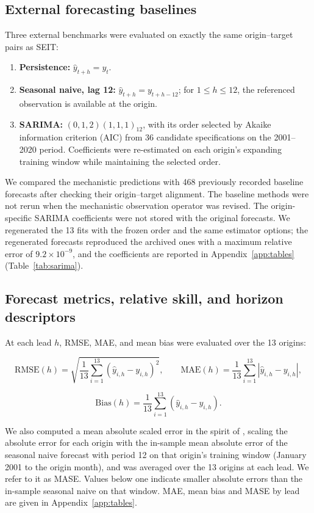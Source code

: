 \documentclass[pdflatex,sn-mathphys-ay]{sn-jnl}
\begin{document}
\subsection{External forecasting baselines}

Three external benchmarks were evaluated on exactly the same origin--target pairs as SEIT:

\begin{enumerate}
\item \textbf{Persistence:} $\widehat y_{t+h}=y_t$.
\item \textbf{Seasonal naive, lag 12:} $\widehat y_{t+h}=y_{t+h-12}$; for $1\le h\le12$, the referenced observation is available at the origin.
\item \textbf{SARIMA:} $(0,1,2)(1,1,1)_{12}$, with its order selected by Akaike information criterion (AIC) from 36 candidate specifications on the 2001--2020 period. Coefficients were re-estimated on each origin's expanding training window while maintaining the selected order.
\end{enumerate}

We compared the mechanistic predictions with 468 previously recorded baseline forecasts after checking their origin--target alignment. The baseline methods were not rerun when the mechanistic observation operator was revised. The origin-specific SARIMA coefficients were not stored with the original forecasts. We regenerated the 13 fits with the frozen order and the same estimator options; the regenerated forecasts reproduced the archived ones with a maximum relative error of $9.2\times10^{-9}$, and the coefficients are reported in Appendix~\ref{app:tables} (Table~\ref{tab:sarima}).

\subsection{Forecast metrics, relative skill, and horizon descriptors}

At each lead $h$, RMSE, MAE, and mean bias were evaluated over the 13 origins:

\[
\mathrm{RMSE}(h)=\sqrt{\frac1{13}\sum_{i=1}^{13}(\widehat y_{i,h}-y_{i,h})^2},\qquad
\mathrm{MAE}(h)=\frac1{13}\sum_{i=1}^{13}|\widehat y_{i,h}-y_{i,h}|,
\]

\[
\mathrm{Bias}(h)=\frac1{13}\sum_{i=1}^{13}(\widehat y_{i,h}-y_{i,h}).
\]

We also computed a mean absolute scaled error in the spirit of \citet{hyndman2006}, scaling the absolute error for each origin with the in-sample mean absolute error of the seasonal naive forecast with period 12 on that origin's training window (January 2001 to the origin month), and was averaged over the 13 origins at each lead. We refer to it as MASE. Values below one indicate smaller absolute errors than the in-sample seasonal naive on that window. MAE, mean bias and MASE by lead are given in Appendix~\ref{app:tables}.
\end{document}
